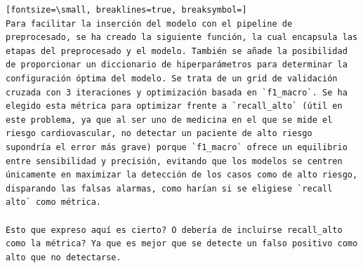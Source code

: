 \documentclass[12pt,a4paper,oneside]{book}
\begin{document}
\begin{iaprompt}
\begin{Verbatim}[fontsize=\small, breaklines=true, breaksymbol=]
Para facilitar la inserción del modelo con el pipeline de preprocesado, se ha creado la siguiente función, la cual encapsula las etapas del preprocesado y el modelo. También se añade la posibilidad de proporcionar un diccionario de hiperparámetros para determinar la configuración óptima del modelo. Se trata de un grid de validación cruzada con 3 iteraciones y optimización basada en `f1_macro`. Se ha elegido esta métrica para optimizar frente a `recall_alto` (útil en este problema, ya que al ser uno de medicina en el que se mide el riesgo cardiovascular, no detectar un paciente de alto riesgo supondría el error más grave) porque `f1_macro` ofrece un equilibrio entre sensibilidad y precisión, evitando que los modelos se centren únicamente en maximizar la detección de los casos como de alto riesgo, disparando las falsas alarmas, como harían si se eligiese `recall alto` como métrica.

Esto que expreso aquí es cierto? O debería de incluirse recall_alto como la métrica? Ya que es mejor que se detecte un falso positivo como alto que no detectarse.
\end{Verbatim}
\end{iaprompt}
\end{document}
